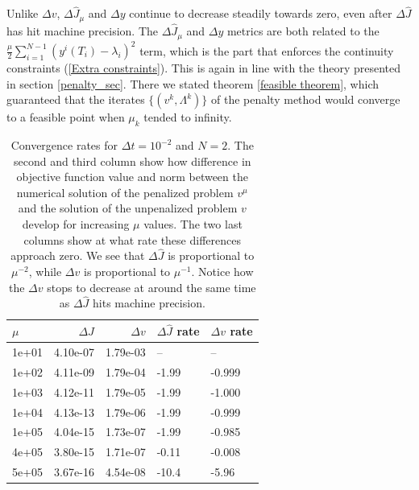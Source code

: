\\
\\
Unlike $\Delta v$, $\Delta\hat J_{\mu}$ and $\Delta y$ continue to decrease steadily towards zero, even after $\Delta \hat J$ has hit machine precision. The $\Delta\hat J_{\mu}$ and $\Delta y$ metrics are both related to the $\frac{\mu }{2}\sum_{i=1}^{N-1}(y^i(T_{i})-\lambda_i)^2$ term, which is the part that enforces the continuity constraints (\ref{Extra constraints}). This is again in line with the theory presented in section \ref{penalty_sec}. There we stated theorem \ref{feasible theorem}, which guaranteed that the iterates $\{(v^{k},\Lambda^k)\}$ of the penalty method would converge to a feasible point when $\mu_k$ tended to infinity. 
\begin{table}[!h]
\centering
\caption{Convergence rates for $\Delta t=10^{-2}$ and $N=2$. The second and third column show how difference in objective function value and norm between the numerical solution of the penalized problem $v^{\mu}$ and the solution of the unpenalized problem $v$ develop for increasing $\mu$ values. The two last columns show at what rate these differences approach zero. We see that $\Delta \hat J$ is proportional to $\mu^{-2}$, while $\Delta v$ is proportional to $\mu^{-1}$. Notice how the $\Delta v$ stops to decrease at around the same time as $\Delta \hat J$ hits machine precision.}
\label{Cosn_rate_table}
\begin{tabular}{lrrll}
\toprule
{} $\mu$&  $\Delta \hat J$ &   $\Delta v$ &        $\Delta \hat J$ rate &        $\Delta v$ rate \\
\midrule
1e+01 &      4.10e-07 & 1.79e-03 &            -- &            -- \\
1e+02 &      4.11e-09 & 1.79e-04 & -1.99 & -0.999 \\
1e+03 &      4.12e-11 & 1.79e-05 & -1.99 & -1.000 \\
1e+04 &      4.13e-13 & 1.79e-06 & -1.99 & -0.999 \\
1e+05 &      4.04e-15 & 1.73e-07 & -1.99 & -0.985 \\
4e+05 &      3.80e-15 & 1.71e-07 & -0.11 & -0.008 \\
5e+05 &      3.67e-16 & 4.54e-08 & -10.4 & -5.96 \\
\bottomrule
\end{tabular}
\end{table}
